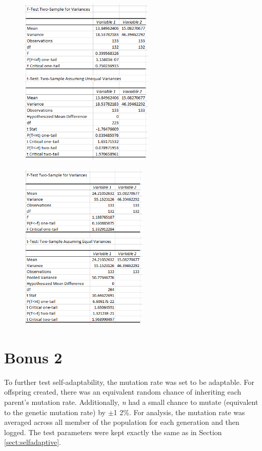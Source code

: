 \documentclass[11pt]{article}
\begin{document}
\begin{figure}[h]
\centering
\begin{minipage}{.5\textwidth}
\centering
  \includegraphics[width=2.5in]{assn1c_stat_anal_crossovers_set1.png}
  \label{fig:statanal1}
\end{minipage}%
\begin{minipage}{.5\textwidth}
\centering
  \includegraphics[width=2.4in]{assn1c_stat_anal_penalty_weight_1_set1.png}
  \label{fig:statanal2}
\end{minipage}
\end{figure}




\section{Bonus 2}
To further test self-adaptability, the mutation rate was set to be adaptable. For offspring created, there was an equivalent random chance of inheriting each parent's mutation rate. Additionally, \textit{n} had a small chance to mutate (equivalent to the genetic mutation rate) by $\pm$1 2\%. For analysis, the mutation rate was averaged across all member of the population for each generation and then logged. The test parameters were kept exactly the same as in Section \ref{sect:selfadaptive}.
\end{document}
